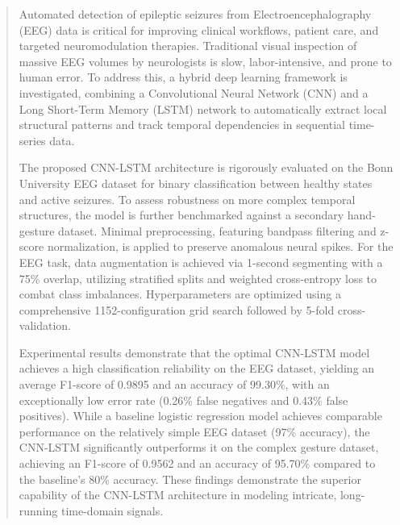 \documentclass[11pt,a4paper]{article}
\begin{document}


\tableofcontents
\thispagestyle{empty}


\newpage
\begin{abstract}
Automated detection of epileptic seizures from Electroencephalography (EEG) data is critical for improving clinical workflows, patient care, and targeted neuromodulation therapies. Traditional visual inspection of massive EEG volumes by neurologists is slow, labor-intensive, and prone to human error. To address this, a hybrid deep learning framework is investigated, combining a Convolutional Neural Network (CNN) and a Long Short-Term Memory (LSTM) network to automatically extract local structural patterns and track temporal dependencies in sequential time-series data.

The proposed CNN-LSTM architecture is rigorously evaluated on the Bonn University EEG dataset for binary classification between healthy states and active seizures. To assess robustness on more complex temporal structures, the model is further benchmarked against a secondary hand-gesture dataset. Minimal preprocessing, featuring bandpass filtering and z-score normalization, is applied to preserve anomalous neural spikes. For the EEG task, data augmentation is achieved via 1-second segmenting with a 75\% overlap, utilizing stratified splits and weighted cross-entropy loss to combat class imbalances. Hyperparameters are optimized using a comprehensive 1152-configuration grid search followed by 5-fold cross-validation.

Experimental results demonstrate that the optimal CNN-LSTM model achieves a high classification reliability on the EEG dataset, yielding an average F1-score of 0.9895 and an accuracy of 99.30\%, with an exceptionally low error rate (0.26\% false negatives and 0.43\% false positives). While a baseline logistic regression model achieves comparable performance on the relatively simple EEG dataset (97\% accuracy), the CNN-LSTM significantly outperforms it on the complex gesture dataset, achieving an F1-score of 0.9562 and an accuracy of 95.70\% compared to the baseline's 80\% accuracy. These findings demonstrate the superior capability of the CNN-LSTM architecture in modeling intricate, long-running time-domain signals.

\end{abstract}
\end{document}
